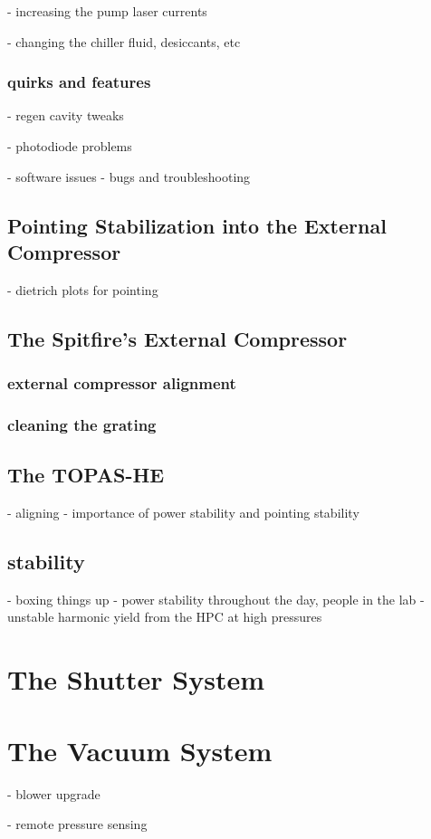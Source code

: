 - increasing the pump laser currents

- changing the chiller fluid, desiccants, etc

\subsubsection{quirks and features}
- regen cavity tweaks

- photodiode problems

- software issues - bugs and troubleshooting

\subsection{Pointing Stabilization into the External Compressor}
- dietrich plots for pointing
\subsection{The Spitfire's External Compressor}
\subsubsection{external compressor alignment}
\subsubsection{cleaning the grating}

\subsection{The TOPAS-HE}
- aligning
- importance of power stability and pointing stability

\subsection{stability}
- boxing things up
- power stability throughout the day, people in the lab
- unstable harmonic yield from the HPC at high pressures
\section{The Shutter System}

\section{The Vacuum System}
- blower upgrade

- remote pressure sensing

